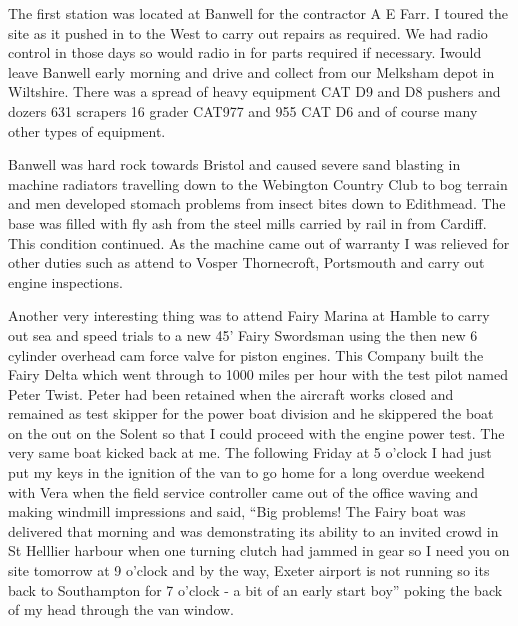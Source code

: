 The first station was located at Banwell for the contractor A E Farr.  I toured
the site as it pushed in to the West to carry out repairs as required.  We had
radio control in those days so would radio in for parts required if necessary.
Iwould leave Banwell early morning and drive and collect from our Melksham
depot in Wiltshire.  There was a spread of heavy equipment CAT D9 and D8
pushers and dozers 631 scrapers 16 grader CAT977 and 955 CAT D6 and of course
many other types of equipment.

 Banwell was hard rock towards Bristol and caused severe sand blasting in
 machine radiators travelling down to the Webington Country Club to bog terrain
 and men developed stomach problems from insect bites down to Edithmead.  The
 base was filled with fly ash from the steel mills carried by rail in from
 Cardiff.    This condition continued.  As the machine came out of warranty I
 was relieved for other duties such as attend to Vosper Thornecroft, Portsmouth
 and carry out engine inspections.

Another very interesting thing was to attend Fairy Marina at Hamble to carry out
sea and speed trials to a new 45' Fairy Swordsman using the then new 6 cylinder
overhead cam force valve for piston engines.  This Company built the Fairy
Delta which went through to 1000 miles per hour with the test pilot named Peter
Twist.  Peter had been retained when the aircraft works closed and remained as
test skipper for the power boat division and he skippered the boat on the out
on the Solent so that I could proceed with the engine power test.  The very
same boat kicked back at me.  The following Friday at 5 o'clock I had just put
my keys in the ignition of the van to go home for a long overdue weekend with
Vera when the field service controller came out of the office waving and making
windmill impressions and said, ``Big problems! The Fairy boat was delivered
that morning and was demonstrating its ability to an invited crowd in St
Helllier harbour when one turning clutch had jammed in gear so I need you on
site tomorrow at 9 o'clock and by the way, Exeter airport is not running so its
back to Southampton for 7 o'clock - a bit of an early start boy'' poking the
back of my head through the van window.

